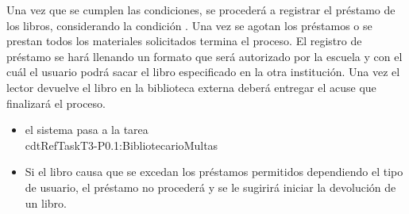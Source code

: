 \begin{PDescripcion}
\begin{enumerate}
      \Ppaso[\itarea]  Una vez que se cumplen las condiciones, se procederá a registrar el préstamo de los libros, considerando la condición . Una vez se agotan los préstamos o se prestan todos los materiales solicitados termina el proceso. El registro de préstamo se hará llenando un formato que será autorizado por la escuela y con el cuál el usuario podrá sacar el libro especificado en la otra institución. 
       \Ppaso[\itarea]  Una vez  el lector devuelve el libro en la biblioteca externa deberá entregar el acuse que finalizará el proceso. 

	\begin{itemize}
	  \item  {} el sistema pasa a la tarea \\cdtRefTask{T3-P0.1:Bibliotecario}{Multas}
	  \item {} Si el libro causa que se excedan los préstamos permitidos dependiendo el tipo de usuario, el préstamo no procederá y se le sugirirá iniciar la devolución de un libro.
\end{itemize}

    \end{enumerate}

\end{PDescripcion}
